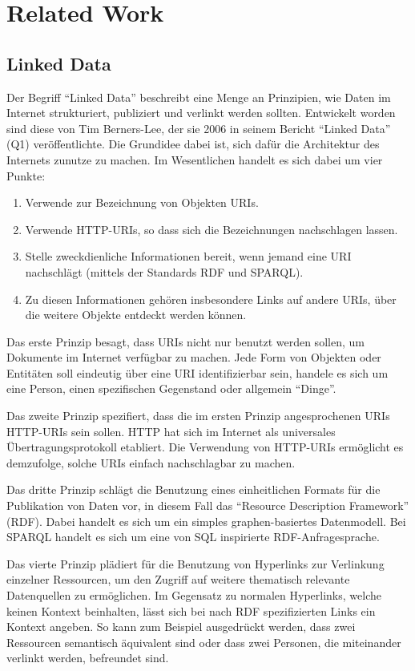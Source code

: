 \section{Related Work}


\subsection{Linked Data}

Der Begriff “Linked Data” beschreibt eine Menge an Prinzipien, wie Daten im Internet strukturiert, publiziert und verlinkt werden sollten. Entwickelt worden sind diese von Tim Berners-Lee, der sie 2006 in seinem Bericht “Linked Data” (Q1) veröffentlichte. Die Grundidee dabei ist, sich dafür die Architektur des Internets zunutze zu machen. Im Wesentlichen handelt es sich dabei um vier Punkte:
\begin{enumerate}
\item Verwende zur Bezeichnung von Objekten URIs.
\item Verwende HTTP-URIs, so dass sich die Bezeichnungen nachschlagen lassen.
\item Stelle zweckdienliche Informationen bereit, wenn jemand eine URI nachschlägt (mittels der Standards RDF und SPARQL).
\item Zu diesen Informationen gehören insbesondere Links auf andere URIs, über die weitere Objekte entdeckt werden können.
\end{enumerate}

Das erste Prinzip besagt, dass URIs nicht nur benutzt werden sollen, um Dokumente im Internet verfügbar zu machen. Jede Form von Objekten oder Entitäten soll eindeutig über eine URI identifizierbar sein, handele es sich um eine Person, einen spezifischen Gegenstand oder allgemein “Dinge”.


Das zweite Prinzip spezifiert, dass die im ersten Prinzip angesprochenen URIs HTTP-URIs sein sollen. HTTP hat sich im Internet als universales Übertragungsprotokoll etabliert. Die Verwendung von HTTP-URIs ermöglicht es demzufolge, solche URIs einfach nachschlagbar zu machen.


Das dritte Prinzip schlägt die Benutzung eines einheitlichen Formats für die Publikation von Daten vor, in diesem Fall das “Resource Description Framework” (RDF). Dabei handelt es sich um ein simples graphen-basiertes Datenmodell. Bei SPARQL handelt es sich um eine von SQL inspirierte RDF-Anfragesprache.


Das vierte Prinzip plädiert für die Benutzung von Hyperlinks zur Verlinkung einzelner Ressourcen, um den Zugriff auf weitere thematisch relevante Datenquellen zu ermöglichen. Im Gegensatz zu normalen Hyperlinks, welche keinen Kontext beinhalten, lässt sich bei nach RDF spezifizierten Links ein Kontext angeben. So kann zum Beispiel ausgedrückt werden, dass zwei Ressourcen semantisch äquivalent sind oder dass zwei Personen, die miteinander verlinkt werden, befreundet sind.


